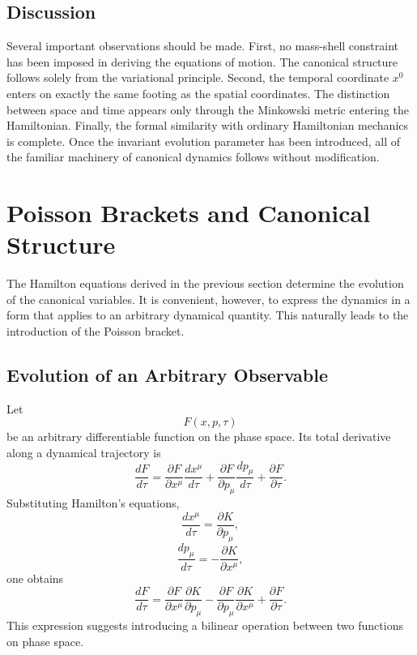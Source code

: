 \subsection{Discussion}
Several important observations should be made.
First, no mass-shell constraint has been imposed in deriving the
equations of motion. The canonical structure follows solely from the
variational principle.
Second, the temporal coordinate \(x^0\) enters on exactly the same
footing as the spatial coordinates. The distinction between space and
time appears only through the Minkowski metric entering the Hamiltonian.
Finally, the formal similarity with ordinary Hamiltonian mechanics is
complete. Once the invariant evolution parameter has been introduced,
all of the familiar machinery of canonical dynamics follows without
modification.
\section{Poisson Brackets and Canonical Structure}
The Hamilton equations derived in the previous section determine the
evolution of the canonical variables. It is convenient, however, to
express the dynamics in a form that applies to an arbitrary dynamical
quantity. This naturally leads to the introduction of the Poisson
bracket.
\subsection{Evolution of an Arbitrary Observable}
Let
\[F(x,p,\tau)\]
be an arbitrary differentiable function on the phase space.
Its total derivative along a dynamical trajectory is
\[\frac{dF}{d\tau}=
\frac{\partial F}{\partial x^\mu}
\frac{dx^\mu}{d\tau}+
\frac{\partial F}{\partial p_\mu}
\frac{dp_\mu}{d\tau}+\frac{\partial F}{\partial\tau}.\]
Substituting Hamilton's equations,
\[\frac{dx^\mu}{d\tau}=\frac{\partial K}{\partial p_\mu},\]
\[\frac{dp_\mu}{d\tau}=-\frac{\partial K}{\partial x^\mu},\]
one obtains
\[\frac{dF}{d\tau}=\frac{\partial F}{\partial x^\mu}
\frac{\partial K}{\partial p_\mu}-
\frac{\partial F}{\partial p_\mu}
\frac{\partial K}{\partial x^\mu}+
\frac{\partial F}{\partial\tau}.
\]
This expression suggests introducing a bilinear operation between two
functions on phase space.
